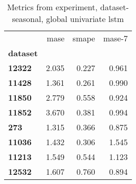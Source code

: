 \begin{table}[h]
\centering
\caption{Metrics from experiment, dataset-seasonal, global univariate lstm}
\label{table:global-univariate-lstm-dataset-seasonal}
\begin{tabular}{lrrr}
\toprule
{} &   mase &  smape &  mase-7 \\
\textbf{dataset} &        &        &         \\
\midrule
\textbf{12322  } &  2.035 &  0.227 &   0.961 \\
\textbf{11428  } &  1.361 &  0.261 &   0.990 \\
\textbf{11850  } &  2.779 &  0.558 &   0.924 \\
\textbf{11852  } &  3.670 &  0.381 &   0.994 \\
\textbf{273    } &  1.315 &  0.366 &   0.875 \\
\textbf{11036  } &  1.432 &  0.306 &   1.545 \\
\textbf{11213  } &  1.549 &  0.544 &   1.123 \\
\textbf{12532  } &  1.607 &  0.760 &   0.894 \\
\bottomrule
\end{tabular}
\end{table}
